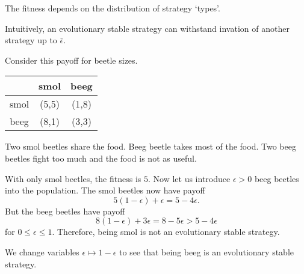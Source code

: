 \begin{remark}
    The fitness depends on the distribution of strategy `types'.
\end{remark}
\begin{remark}
    Intuitively, an evolutionary stable strategy can withstand invation of another strategy up to $\bar\epsilon$.
\end{remark}
\begin{aexample}{}{}
    Consider this payoff for beetle sizes. \begin{center}
        \begin{tabular}{|c|c c|} 
            \hline &smol& beeg \\
            
            \hline
            smol&(5,5)&(1,8)\\
            \hline beeg&(8,1)&(3,3)
            \\ \hline
        \end{tabular}
    \end{center}
    Two smol beetles share the food. Beeg beetle takes most of the food. Two beeg beetles fight too much and the food is not as useful.

    With only smol beetles, the fitness is $5$. Now let us introduce $\epsilon>0$ beeg beetles into the population. The smol beetles now have payoff \[
    5(1-\epsilon)+ \epsilon = 5-4\epsilon.
    \]
    But the beeg beetles have payoff \[
    8(1-\epsilon) + 3\epsilon = 8-5\epsilon > 5-4\epsilon
    \]
    for $0\leq\epsilon\leq 1$. Therefore, being smol is not an evolutionary stable strategy.

    We change variables $\epsilon\mapsto 1-\epsilon$ to see that being beeg is an evolutionary stable strategy.
\end{aexample}
